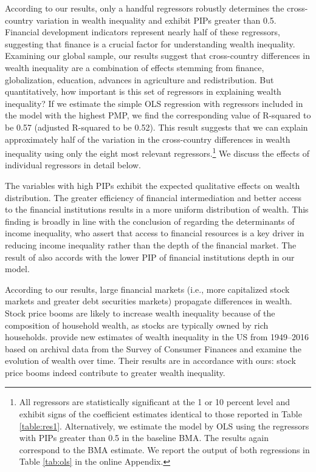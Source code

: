 \documentclass[a4paper,11pt]{article}
\begin{document}
According to our results, only a handful regressors robustly determines the cross-country variation in wealth inequality and exhibit \acp{PIP} greater than 0.5. Financial development indicators represent nearly half of these regressors, suggesting that finance is a crucial factor for understanding wealth inequality. Examining our global sample, our results suggest that cross-country differences in wealth inequality are a combination of effects stemming from finance, globalization, education, advances in agriculture and redistribution. But quantitatively, how important is this set of regressors in explaining wealth inequality? If we estimate the simple OLS regression with regressors included in the model with the highest \ac{PMP}, we find the corresponding value of R-squared to be 0.57 (adjusted R-squared to be 0.52). This result suggests that we can explain approximately half of the variation in the cross-country differences in wealth inequality using only the eight most relevant regressors.\footnote{All regressors are statistically significant at the 1 or 10 percent level and exhibit signs of the coefficient estimates identical to those reported in Table \ref{table:res1}. Alternatively, we estimate the model by OLS using the regressors with \acp{PIP} greater than 0.5 in the baseline \ac{BMA}. The results again correspond to the \ac{BMA} estimate. We report the output of both regressions in Table \ref{tab:ols} in the online Appendix.} We discuss the effects of individual regressors in detail below.

The variables with high \acp{PIP} exhibit the expected qualitative effects on wealth distribution. The greater efficiency of financial intermediation and better access to the financial institutions results in a more uniform distribution of wealth. This finding is broadly in line with the conclusion of \citet{claessens2007finance} regarding the determinants of income inequality, who assert that access to financial resources is a key driver in reducing income inequality rather than the depth of the financial market. The result of \citet{claessens2007finance} also accords with the lower PIP of financial institutions depth in our model. 

According to our results, large financial markets (i.e., more capitalized stock markets and greater debt securities markets) propagate differences in wealth. Stock price booms are likely to increase wealth inequality because of the composition of household wealth, as stocks are typically owned by rich households. \citet{kuhn} provide new estimates of wealth inequality in the US from 1949--2016 based on archival data from the Survey of Consumer Finances and examine the evolution of wealth over time. Their results are in accordance with ours: stock price booms indeed contribute to greater wealth inequality.  
\end{document}
